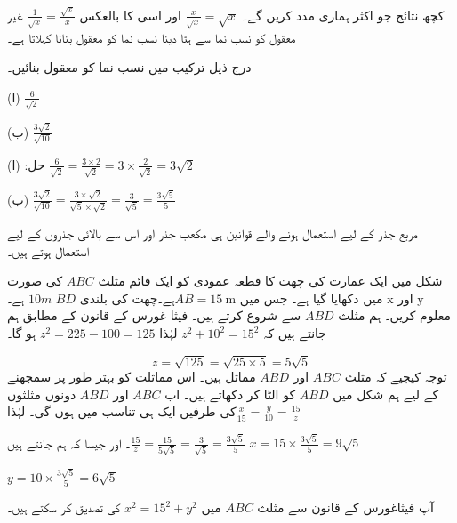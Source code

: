 کچھ نتائج جو اکثر ہماری مدد کریں گے۔
\(\frac{x}{\sqrt{x}}=\sqrt{x}\) اور اسی کا بالعکس \(\frac{1}{\sqrt{x}}=\frac{\sqrt{x}}{x}\)
غیر معقول کو نسب نما سے ہٹا دینا نسب نما کو معقول بنانا کہلاتا ہے۔

درج ذیل ترکیب میں نسب نما کو معقول بنائیں۔

(ا)
\(\frac{6}{\sqrt{2}}\)

(ب)
\(\frac{3\sqrt{2}}{\sqrt{10}}\)

حل:
(ا)
\(\frac{6}{\sqrt{2}}=\frac{3\times 2}{\sqrt{2}}=3\times\frac{2}{\sqrt{2}}=3\sqrt{2}\)

(ب)
\(\frac{3\sqrt{2}}{\sqrt{10}}=\frac{3\times\sqrt{2}}{\sqrt{5}\times\sqrt{2}}=\frac{3}{\sqrt{5}}=\frac{3\sqrt{5}}{5}\)

مربع جذر کے لیے استعمال ہونے والے قوانین ہی مکعب جذر اور اس سے بالائی جذروں کے لیے استعمال ہوتے ہیں۔

شکل  میں ایک عمارت کی چھت کا قطعہ عمودی کو ایک قائم مثلث \(ABC\) کی صورت میں دکھایا گیا ہے۔ جس میں
 \(AB=\SI{15}{\meter}\)ہے۔چھت کی بلندی
 \(BD\) \(10m\) ہے۔ x اور y  معلوم کریں۔
ہم مثلث \(ABD\) سے شروع کرتے ہیں۔ فیثا غورس کے قانون کے مطابق ہم جانتے ہیں کہ
 \(z^{2}+10^{2}=15^{2}\)
لہٰذا \(z^{2}=225-100=125\) ہو گا۔

\[z=\sqrt{125}=\sqrt{25\times 5}=5\sqrt{5}\]
توجہ کیجیے کہ مثلث \(ABC\) اور \(ABD\) مماثل ہیں۔ اس مماثلت کو بہتر طور پر سمجھنے کے لیے ہم  شکل   میں \(ABD\) کو الٹا کر دکھاتے ہیں۔ اب \(ABC\) اور \(ABD\) دونوں مثلثوں کی طرفیں ایک ہی تناسب میں ہوں گی۔ لہٰذا\(\frac{x}{15}=\frac{y}{10}=\frac{15}{z}\)

۔ اور جیسا کہ ہم جانتے ہیں\(\frac{15}{z}=\frac{15}{5\sqrt{5}}=\frac{3}{\sqrt{5}}=\frac{3\sqrt{5}}{5}\)
\(x=15\times\frac{3\sqrt{5}}{5}=9\sqrt{5}\)

\(y=10\times\frac{3\sqrt{5}}{5}=6\sqrt{5}\)

آپ فیثاغورس کے قانون سے مثلث  \(ABC\) میں \(x^{2}=15^{2}+y^{2}\) کی تصدیق کر سکتے ہیں۔

